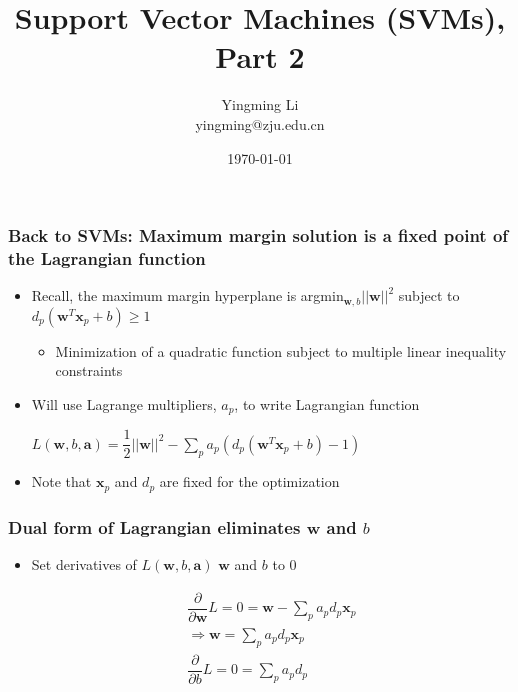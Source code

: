\documentclass[12pt,notes,mathserif]{beamer}
\title{Support Vector Machines (SVMs), Part 2}
\author[YingmingLi]{Yingming Li \\ yingming@zju.edu.cn}
\institute[DSERC, ZJU]{Data Science \& Engineering Research Center, ZJU}
\date[\today]{\today}
\begin{document}

\begin{frame}[c]
	\titlepage
\end{frame}

\begin{frame}[c]
\frametitle{Back to SVMs: Maximum margin solution is a fixed point of the Lagrangian function}
\begin{itemize}
\item Recall, the maximum margin hyperplane is argmin$_{\mathbf{w},b}||\mathbf{w}||^2$ subject to $d_p(\mathbf{w}^T\mathbf{x}_p+b)\geqslant{}1$
\begin{itemize}
\item Minimization of a quadratic function subject to multiple linear inequality constraints
\end{itemize}
\item Will use Lagrange multipliers, $a_p$, to write Lagrangian function

$L(\mathbf{w},b,\mathbf{a})=\dfrac{1}{2}||\mathbf{w}||^2-\sum\limits_pa_p(d_p(\mathbf{w}^T\mathbf{x}_p+b)-1)$
\item Note that $\mathbf{x}_p$ and $d_p$ are fixed for the optimization
\end{itemize}

\end{frame}


\begin{frame}[c]
\frametitle{Dual form of Lagrangian eliminates $\mathbf{w}$ and $b$}
\begin{itemize}
\item Set derivatives of $L(\mathbf{w},b,\mathbf{a})$ \wrt $\mathbf{w}$ and $b$ to 0

\begin{align*}
\dfrac{\partial}{\partial \mathbf{w}}L=0=\mathbf{w}-\sum_pa_pd_p\mathbf{x}_p\\
\Rightarrow \mathbf{w}=\sum_pa_pd_p\mathbf{x}_p\\
\dfrac{\partial}{\partial b}L=0=\sum_pa_pd_p
\end{align*}

\end{itemize}
\end{frame}
\end{document}
